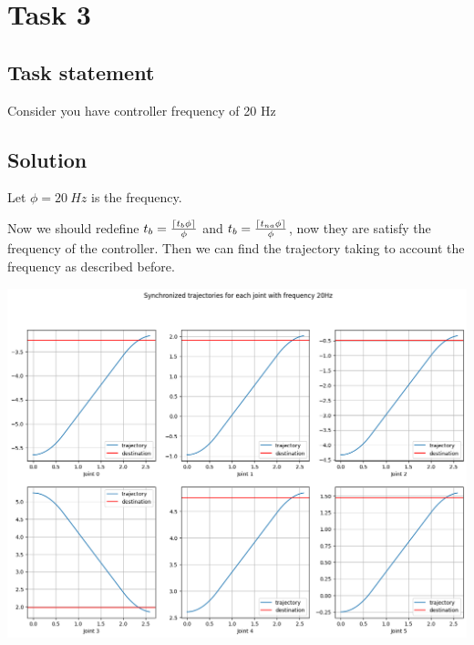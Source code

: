 \section*{Task 3}

\subsection*{Task statement}

Consider you have controller frequency of 20 Hz

\subsection*{Solution}

Let $\phi = 20\ Hz$ is the frequency.

Now we should redefine $t_b = \frac{\ceil*{t_b \phi}}{\phi}$ and $t_b = \frac{\ceil*{t_{na} \phi}}{\phi}$, now they are satisfy the frequency of the controller.
Then we can find the trajectory taking to account the frequency as described before.

\includegraphics[width=\linewidth]{images/trajectory_frequency.png}